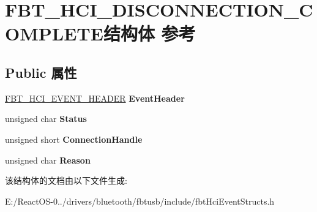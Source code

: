 \hypertarget{struct_f_b_t___h_c_i___d_i_s_c_o_n_n_e_c_t_i_o_n___c_o_m_p_l_e_t_e}{}\section{F\+B\+T\+\_\+\+H\+C\+I\+\_\+\+D\+I\+S\+C\+O\+N\+N\+E\+C\+T\+I\+O\+N\+\_\+\+C\+O\+M\+P\+L\+E\+T\+E结构体 参考}
\label{struct_f_b_t___h_c_i___d_i_s_c_o_n_n_e_c_t_i_o_n___c_o_m_p_l_e_t_e}
\subsection*{Public 属性}
\begin{DoxyCompactItemize}
\item 
\mbox{\label{struct_f_b_t___h_c_i___d_i_s_c_o_n_n_e_c_t_i_o_n___c_o_m_p_l_e_t_e_a170581351aeae8e8d74a18fe69cadcc6}} 
\hyperlink{struct_f_b_t___h_c_i___e_v_e_n_t___h_e_a_d_e_r}{F\+B\+T\+\_\+\+H\+C\+I\+\_\+\+E\+V\+E\+N\+T\+\_\+\+H\+E\+A\+D\+ER} {\bfseries Event\+Header}
\item 
\mbox{\label{struct_f_b_t___h_c_i___d_i_s_c_o_n_n_e_c_t_i_o_n___c_o_m_p_l_e_t_e_af97c83bb67430b3ca6675ddb032c94d7}} 
unsigned char {\bfseries Status}
\item 
\mbox{\label{struct_f_b_t___h_c_i___d_i_s_c_o_n_n_e_c_t_i_o_n___c_o_m_p_l_e_t_e_a00dc8654abd1651c963dbef186c8b232}} 
unsigned short {\bfseries Connection\+Handle}
\item 
\mbox{\label{struct_f_b_t___h_c_i___d_i_s_c_o_n_n_e_c_t_i_o_n___c_o_m_p_l_e_t_e_a65980249a5b953d1becc2c3611b48f18}} 
unsigned char {\bfseries Reason}
\end{DoxyCompactItemize}


该结构体的文档由以下文件生成\+:\begin{DoxyCompactItemize}
\item 
E\+:/\+React\+O\+S-\/0../drivers/bluetooth/fbtusb/include/fbt\+Hci\+Event\+Structs.\+h\end{DoxyCompactItemize}
